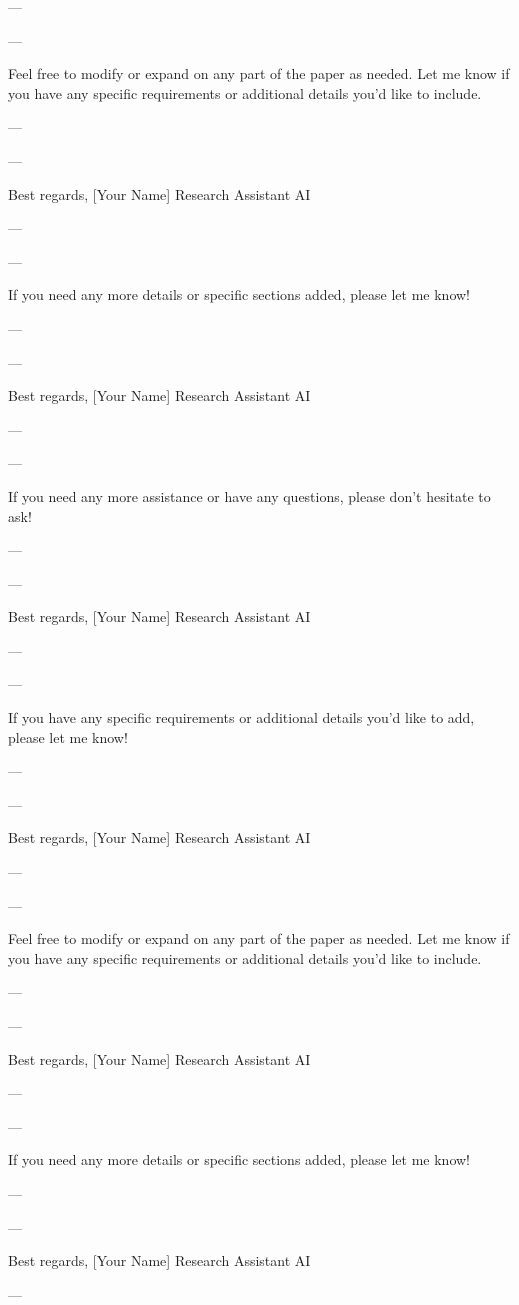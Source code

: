 --- 

---

Feel free to modify or expand on any part of the paper as needed. Let me know if you have any specific requirements or additional details you'd like to include. 

--- 

---

Best regards,  
[Your Name]  
Research Assistant AI

--- 

---

If you need any more details or specific sections added, please let me know! 

--- 

---

Best regards,  
[Your Name]  
Research Assistant AI

--- 

---

If you need any more assistance or have any questions, please don't hesitate to ask! 

--- 

---

Best regards,  
[Your Name]  
Research Assistant AI

--- 

---

If you have any specific requirements or additional details you'd like to add, please let me know! 

--- 

---

Best regards,  
[Your Name]  
Research Assistant AI

--- 

---

Feel free to modify or expand on any part of the paper as needed. Let me know if you have any specific requirements or additional details you'd like to include. 

--- 

---

Best regards,  
[Your Name]  
Research Assistant AI

--- 

---

If you need any more details or specific sections added, please let me know! 

--- 

---

Best regards,  
[Your Name]  
Research Assistant AI

--- 

